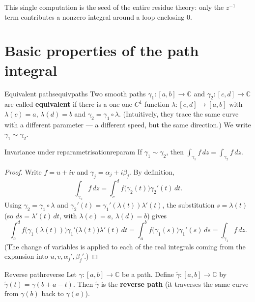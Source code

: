 \documentclass[11pt,openany]{report}
\newcommand{\C}{\mathbb{C}}
\begin{document}
\begin{remark}
This single computation is the seed of the entire residue theory: only the $z^{-1}$ term
contributes a nonzero integral around a loop enclosing $0$.
\end{remark}

\section{Basic properties of the path integral}

\begin{definition}{Equivalent paths}{equivpaths}
Two smooth paths $\gamma_1:[a,b]\to\C$ and $\gamma_2:[c,d]\to\C$ are called
\textbf{equivalent} if there is a one-one $C^1$ function $\lambda:[c,d]\to[a,b]$ with
$\lambda(c)=a$, $\lambda(d)=b$ and $\gamma_2=\gamma_1\circ\lambda$. (Intuitively, they
trace the same curve with a different parameter --- a different speed, but the same
direction.) We write $\gamma_1\sim\gamma_2$.
\end{definition}

\begin{theorem}{Invariance under reparametrisation}{reparam}
If $\gamma_1\sim\gamma_2$, then $\displaystyle\int_{\gamma_1}f\,dz = \int_{\gamma_2}f\,dz$.
\end{theorem}

\begin{proof}
Write $f=u+iv$ and $\gamma_j=\alpha_j+i\beta_j$. By definition,
\[
  \int_{\gamma_2}f\,dz = \int_c^d f\bigl(\gamma_2(t)\bigr)\gamma_2'(t)\,dt .
\]
Using $\gamma_2=\gamma_1\circ\lambda$ and $\gamma_2'(t)=\gamma_1'(\lambda(t))\lambda'(t)$,
the substitution $s=\lambda(t)$ (so $ds=\lambda'(t)\,dt$, with $\lambda(c)=a$,
$\lambda(d)=b$) gives
\[
  \int_c^d f\bigl(\gamma_1(\lambda(t))\bigr)\gamma_1'\bigl(\lambda(t)\bigr)\lambda'(t)\,dt
  = \int_a^b f\bigl(\gamma_1(s)\bigr)\gamma_1'(s)\,ds
  = \int_{\gamma_1}f\,dz .
\]
(The change of variables is applied to each of the real integrals coming from the
expansion into $u,v,\alpha_j',\beta_j'$.)
\end{proof}

\begin{definition}{Reverse path}{reverse}
Let $\gamma:[a,b]\to\C$ be a path. Define $\widetilde\gamma:[a,b]\to\C$ by
$\widetilde\gamma(t)=\gamma(b+a-t)$. Then $\widetilde\gamma$ is the \textbf{reverse path}
(it traverses the same curve from $\gamma(b)$ back to $\gamma(a)$).
\end{definition}
\end{document}
